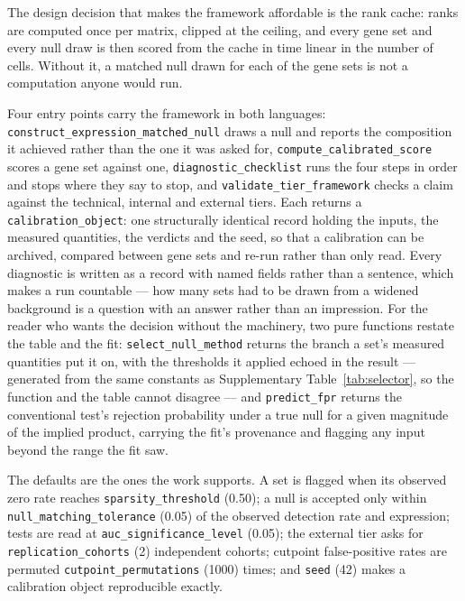 \documentclass[11pt]{article}
\newcommand{\code}[1]{\texttt{#1}}
\begin{document}
The design decision that makes the framework affordable is the rank cache:
ranks are computed once per matrix, clipped at the ceiling, and every gene set
and every null draw is then scored from the cache in time linear in the number
of cells. Without it, a matched null drawn for each of the \benchSets{} gene
sets is not a computation anyone would run.

Four entry points carry the framework in both languages:
\code{construct\_expression\allowbreak\_matched\allowbreak\_null} draws a null
and reports the composition it achieved rather than the one it was asked for,
\code{compute\_calibrated\allowbreak\_score} scores a gene set against one,
\code{diagnostic\_checklist} runs the four steps in order and stops where they
say to stop, and \code{validate\_tier\allowbreak\_framework} checks a claim
against the technical, internal and external tiers. Each returns a
\code{calibration\_object}: one structurally identical record holding the
inputs, the measured quantities, the verdicts and the seed, so that a
calibration can be archived, compared between gene sets and re-run rather than
only read. Every diagnostic is written as a record with named fields rather
than a sentence, which makes a run countable --- how many sets had to be drawn
from a widened background is a question with an answer rather than an
impression. For the reader who wants the decision without the machinery, two
pure functions restate the table and the fit:
\code{select\_null\_method} returns the branch a set's measured quantities put
it on, with the thresholds it applied echoed in the result --- generated from
the same constants as Supplementary Table~\ref{tab:selector}, so the function
and the table cannot disagree --- and \code{predict\_fpr} returns the
conventional test's rejection probability under a true null for a given
magnitude of the implied product, carrying the fit's provenance and flagging
any input beyond the range the fit saw.

The defaults are the ones the work supports. A set is flagged when its observed
zero rate reaches \code{sparsity\_threshold} (0.50); a null is accepted only
within \code{null\_matching\_tolerance} (0.05) of the observed detection rate
and expression; tests are read at \code{auc\_significance\_level} (0.05); the
external tier asks for \code{replication\_cohorts} (2) independent cohorts;
cutpoint false-positive rates are permuted \code{cutpoint\_permutations} (1000)
times; and \code{seed} (42) makes a calibration object reproducible exactly.
\end{document}
